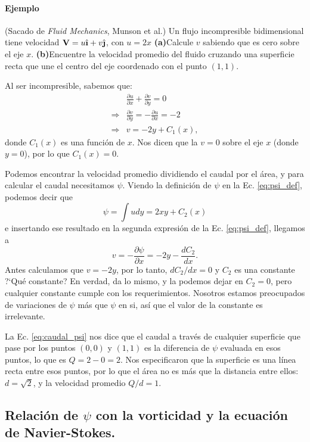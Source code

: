 \paragraph*{Ejemplo}
(Sacado de \emph{Fluid Mechanics}, Munson et al.)
Un flujo incompresible bidimensional tiene velocidad $\mathbf{V}=u\ihat+v\jhat$, con $u=2x$
{\bf (a)}Calcule $v$ sabiendo que es cero sobre el eje $x$.
{\bf (b)}Encuentre la velocidad promedio del fluido cruzando una superficie recta que une el centro del eje coordenado con el punto $(1,1)$.

Al ser incompresible, sabemos que:
%
\begin{align}
&\frac{\partial u}{\partial x} + \frac{\partial v}{\partial y} = 0 \nonumber \\
\Rightarrow &\frac{\partial v}{\partial y} = -\frac{\partial u}{\partial x} = -2 \nonumber \\
\Rightarrow &v = -2y + C_1(x),
\end{align}
%
donde $C_1(x)$ es una función de $x$.
Nos dicen que la $v=0$ sobre el eje $x$ (donde $y=0$), por lo que $C_1(x)=0$.

Podemos encontrar la velocidad promedio dividiendo el caudal por el área, y para calcular el caudal necesitamos $\psi$.
Viendo la definición de $\psi$ en la Ec. \eqref{eq:psi_def}, podemos decir que
%
\begin{equation}
\psi = \int u dy = 2xy + C_2(x)
\end{equation}
%
e insertando ese resultado en la segunda expresión de la Ec. \eqref{eq:psi_def}, llegamos a
%
\begin{equation}
v = -\frac{\partial \psi}{\partial x} = -2y - \frac{dC_2}{dx}.
\end{equation}
%
Antes calculamos que $v=-2y$, por lo tanto, $dC_2/dx=0$ y $C_2$ es una constante
\mbox{?`}Qué constante? En verdad, da lo mismo, y la podemos dejar en $C_2=0$, pero cualquier constante cumple con los requerimientos.
Nosotros estamos preocupados de variaciones de $\psi$ más que $\psi$ en si, así que el valor de la constante es irrelevante.

La Ec. \eqref{eq:caudal_psi} nos dice que el caudal a través de cualquier superficie que pase por los puntos $(0,0)$ y $(1,1)$ es la diferencia de $\psi$ evaluada en esos puntos, lo que es $Q=2-0=2$.
Nos especificaron que la superficie es una línea recta entre esos puntos, por lo que el área no es más que la distancia entre ellos: $d=\sqrt{2}$, y la velocidad promedio $Q/d=1$.

\subsection*{Relación de $\psi$ con la vorticidad y la ecuación de Navier-Stokes.}

